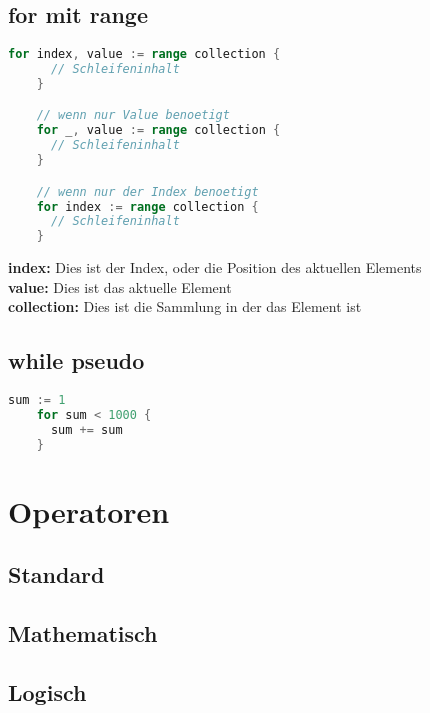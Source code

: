 \documentclass[twoside,a4paper,12pt]{article}
\begin{document}
\subsection{for mit range}
\begin{center}
  \begin{minipage}{1.0\textwidth}
    \begin{lstlisting}[language=Go]
    for index, value := range collection {
      // Schleifeninhalt
    }

    // wenn nur Value benoetigt
    for _, value := range collection { 
      // Schleifeninhalt
    }

    // wenn nur der Index benoetigt 
    for index := range collection {
      // Schleifeninhalt 
    }
    \end{lstlisting}
  \end{minipage}
\end{center}
\textbf{index:} Dies ist der Index, oder die Position des aktuellen Elements \\ 
\textbf{value:} Dies ist das aktuelle Element \\ 
\textbf{collection:} Dies ist die Sammlung in der das Element ist \\

\subsection{while pseudo}
\begin{center}
  \begin{minipage}{1.0\textwidth}
    \begin{lstlisting}[language=Go]
    sum := 1 
    for sum < 1000 { 
      sum += sum
    }
    \end{lstlisting}
  \end{minipage}
\end{center}

\section{Operatoren}
\subsection{Standard}
\subsection{Mathematisch}
\subsection{Logisch}
\end{document}
